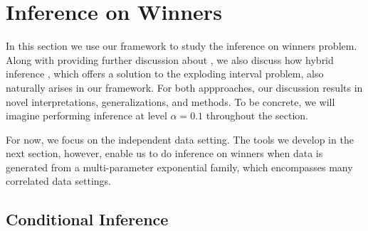 \documentclass{article}
\begin{document}
\section{Inference on Winners}
\label{sec:winner}

In this section we use our framework to study the inference on winners problem. Along with providing further discussion about , we also discuss how hybrid inference \citep{Andrews2023}, which offers a solution to the exploding interval problem, also naturally arises in our framework. For both appproaches, our discussion results in novel interpretations, generalizations, and methods. To be concrete, we will imagine performing inference at level $\alpha = 0.1$ throughout the section.

For now, we focus on the independent data setting. The tools we develop in the next section, however, enable us to do inference on winners when data is generated from a multi-parameter exponential family, which encompasses many correlated data settings. 


\subsection{Conditional Inference}
\end{document}
